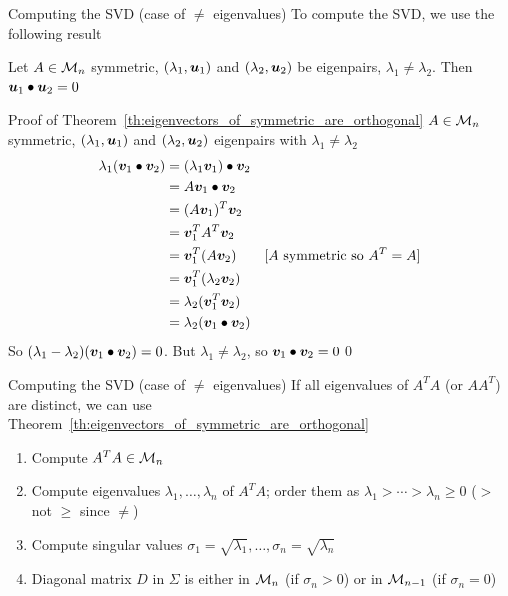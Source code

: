 \documentclass[aspectratio=169]{beamer}\usepackage[]{graphicx}\usepackage[]{xcolor}
\begin{document}
\begin{frame}{Computing the SVD (case of $\neq$ eigenvalues)}
To compute the SVD, we use the following result
\vfill
\begin{theorem}\label{th:eigenvectors_of_symmetric_are_orthogonal}
Let $A\in\mathcal{M}_n$ symmetric, $(\lambda_1,\bm{u}_1)$ and $(\lambda_2,\bm{u}_2)$ be eigenpairs, $\lambda_1\neq\lambda_2$. Then $\bm{u}_1\bullet\bm{u}_2=0$
\end{theorem}
\end{frame}

\begin{frame}{Proof of Theorem~\ref{th:eigenvectors_of_symmetric_are_orthogonal}}
$A\in\mathcal{M}_n$ symmetric, $(\lambda_1,\bm{u}_1)$ and $(\lambda_2,\bm{u}_2)$ eigenpairs with $\lambda_1\neq\lambda_2$
\begin{align*}
\lambda_1(\bm{v}_1\bullet\bm{v}_2) 
&= (\lambda_1\bm{v}_1)\bullet\bm{v}_2 \\
&= A\bm{v}_1\bullet\bm{v}_2 \\
&= (A\bm{v}_1)^T\bm{v}_2 \\
&= \bm{v}_1^TA^T\bm{v}_2 \\
&= \bm{v}_1^T(A\bm{v}_2)  \qquad\textrm{[$A$ symmetric so $A^T=A$]} \\
&= \bm{v}_1^T(\lambda_2\bm{v}_2) \\
&= \lambda_2(\bm{v}_1^T\bm{v}_2) \\
&= \lambda_2(\bm{v}_1\bullet\bm{v}_2)
\end{align*}
\vfill
So $(\lambda_1-\lambda_2)(\bm{v}_1\bullet\bm{v}_2)=0$. But $\lambda_1\neq\lambda_2$, so $\bm{v}_1\bullet\bm{v}_2=0$\hfill\qed
\end{frame}


\begin{frame}{Computing the SVD (case of $\neq$ eigenvalues)}
If all eigenvalues of $A^TA$ (or $AA^T$) are distinct, we can use Theorem~\ref{th:eigenvectors_of_symmetric_are_orthogonal}
\vfill
\begin{enumerate}
\item Compute $A^TA\in\mathcal{M}_n$
\item Compute eigenvalues $\lambda_1,\ldots,\lambda_n$ of $A^TA$; order them as $\lambda_1>\cdots>\lambda_n\geq 0$ ($>$ not $\geq$ since $\neq$)
\item Compute singular values $\sigma_1=\sqrt{\lambda_1},\ldots,\sigma_n=\sqrt{\lambda_n}$
\item Diagonal matrix $D$ in $\Sigma$ is either in $\mathcal{M}_n$ (if $\sigma_n>0$) or in $\mathcal{M}_{n-1}$ (if $\sigma_n=0$)
\end{enumerate}
\end{frame}
\end{document}
